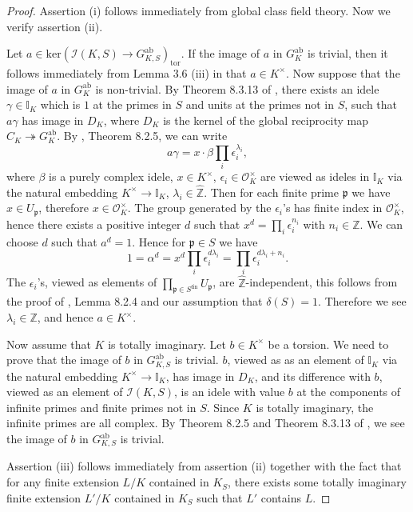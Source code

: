 \documentclass{article}
\theoremstyle{plain}
\theoremstyle{definition}
\theoremstyle{remark}
\begin{document}
\begin{proof}
Assertion (i) follows immediately from global class field theory. Now we verify assertion (ii). \par 
Let $a \in \text{ker}(\mathcal{I}(K,S) \to G_{K,S}^{\text{ab}})_{\text{tor}}$. If the image of $a$ in $G_K^{\text{ab}}$ is trivial, then it follows immediately from Lemma 3.6 (iii) in \cite{Ho1} that $a \in K^{\times}$. Now suppose that the image of $a$ in $G_K^{\text{ab}}$ is non-trivial. By Theorem 8.3.13 of \cite{NSW}, there exists an idele $\gamma\in\mathbb{I}_{K}$ which is $1$ at the primes in $S$ and units at the primes not in $S$, such that $a\gamma$ has image in $D_{K}$, where $D_{K}$ is the kernel of the global reciprocity map $C_{K}\twoheadrightarrow G_{K}^{\text{ab}}$. By \cite{NSW} , Theorem 8.2.5, we can write 
$$a\gamma=x\cdot\beta\prod_{i}\epsilon_{i}^{\lambda_{i}},$$
where $\beta$ is a purely complex idele, $x\in K^{\times}$, $\epsilon_{i}\in\mathcal{O}_{K}^{\times}$ are viewed as ideles in $\mathbb{I}_{K}$ via the natural embedding $K^{\times}\to\mathbb{I}_{K}$, $\lambda_{i}\in\widehat{\mathbb{Z}}$. Then for each finite prime $\mathfrak{p}$ we have $x\in U_{\mathfrak{p}}$, therefore $x\in\mathcal{O}_{K}^{\times}$. The group generated by the $\epsilon_{i}$'s has finite index in $\mathcal{O}_{K}^{\times}$, hence there exists a positive integer $d$ such that $x^{d}=\prod_{i}\epsilon_{i}^{n_{i}}$ with $n_{i}\in\mathbb{Z}$. We can choose $d$ such that $a^{d}=1$. Hence for $\mathfrak{p}\in S$ we have
$$1=\alpha^{d}=x^{d}\prod_{i}\epsilon_{i}^{d\lambda_{i}}=\prod_{i}\epsilon_{i}^{d\lambda_{i}+n_{i}}.$$
The $\epsilon_{i}$'s, viewed as elements of $\prod_{\mathfrak{p}\in S^{\text{fin}}}U_{\mathfrak{p}}$, are $\widehat{\mathbb{Z}}$-independent, this follows from the proof of \cite{NSW}, Lemma 8.2.4 and our assumption that $\delta(S)=1$. Therefore we see $\lambda_{i}\in\mathbb{Z}$, and hence $a \in K^{\times}$. \par 
Now assume that $K$ is totally imaginary. Let $b \in K^{\times}$ be a torsion. We need to prove that the image of $b$ in $G_{K,S}^{\text{ab}}$ is trivial. $b$, viewed as as an element of $\mathbb{I}_{K}$ via the natural embedding $K^{\times}\to\mathbb{I}_{K}$, has image in $D_{K}$, and its difference with $b$, viewed as an element of $\mathcal{I}(K,S)$, is an idele with value $b$ at the components of infinite primes and finite primes not in $S$. Since $K$ is totally imaginary, the infinite primes are all complex. By Theorem 8.2.5 and Theorem 8.3.13 of \cite{NSW}, we see the image of $b$ in $G_{K,S}^{\text{ab}}$ is trivial. \par 
Assertion (iii) follows immediately from assertion (ii) together with the fact that for any finite extension $L/K$ contained in $K_S$, there exists some totally imaginary finite extension $L'/K$ contained in $K_S$ such that $L'$ contains $L$.
\end{proof}
\end{document}
